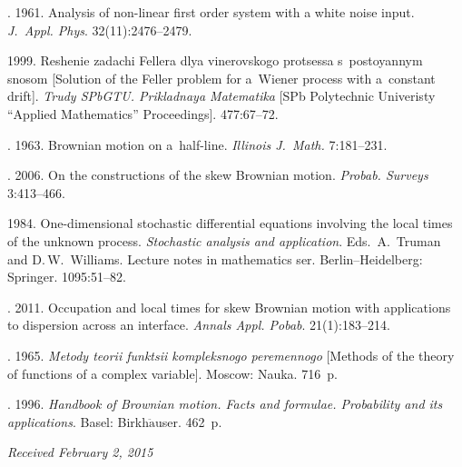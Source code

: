 \begin{multicols}{2}
{{\begin{thebibliography}{99}
. 1961.
Analysis of non-linear first order system with a white noise input.
\textit{J.~Appl. Phys}. 32(11):2476--2479.

 1999. Reshenie zadachi Fellera dlya vinerovskogo protsessa s~postoyannym snosom [Solution of the Feller problem for a~Wiener process with a~constant drift]. \textit{Trudy SPbGTU. Prikladnaya Matematika} [SPb Polytechnic Univeristy ``Applied Mathematics'' Proceedings]. 477:67--72.

. 1963. Brownian motion on a~half-line.
\textit{Illinois J.~Math.} 7:181--231.

.
2006. On the constructions of the skew Brownian motion.
\textit{Probab. Surveys} 3:413--466.

 1984. One-dimensional stochastic differential equations involving the local times of the unknown process. \textit{Stochastic
analysis and application}. Eds.\ A.~Truman and D.\,W.~Williams.
Lecture notes in mathematics ser. Berlin--Heidelberg: Springer.
1095:51--82.

. 2011. Occupation and local times for skew Brownian motion with applications to dispersion across an interface. \textit{ Annals Appl. Pobab}. 21(1):183--214.

. 1965. \textit{Metody teorii funktsii kompleksnogo peremennogo} [Methods of the theory of functions of a complex variable]. Moscow: Nauka. 716~p.

. 1996. \textit{Handbook of Brownian motion. Facts and formulae. Probability and its applications}. Basel: Birkh$\ddot{\mbox{a}}$user. 462~p.
\end{thebibliography}

 }
 }

\end{multicols}

\vspace*{-3pt}

\hfill{\small\textit{Received February 2, 2015}}




\Contr

